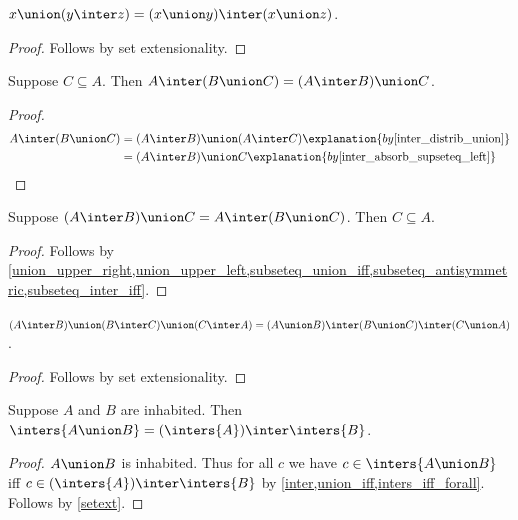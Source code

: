 \begin{proposition}%
\label{union_distrib_inter}
    $x\union (y\inter z) = (x\union y)\inter (x\union z)$.
\end{proposition}
\begin{proof}
    Follows by set extensionality.
\end{proof}

\begin{proposition}\label{union_inter_assoc_intro}
    Suppose $C\subseteq A$.
    Then $A\inter (B\union C) = (A\inter B)\union C$.
\end{proposition}
\begin{proof}
    \begin{align*}
        A\inter (B\union C) &= (A\inter B)\union (A\inter C) \explanation{by \cref{inter_distrib_union}}\\
        &= (A\inter B)\union C \explanation{by \cref{inter_absorb_supseteq_left}}
    \end{align*}
\end{proof}

\begin{proposition}\label{union_inter_assoc_elim}
    Suppose $(A\inter B)\union C = A\inter (B\union C)$.
    Then $C\subseteq A$.
\end{proposition}
\begin{proof}
    Follows by \cref{union_upper_right,union_upper_left,subseteq_union_iff,subseteq_antisymmetric,subseteq_inter_iff}.
\end{proof}

\begin{proposition}\label{union_inter_crazy}
    $(A\inter B)\union (B\inter C)\union (C\inter A)
    =
    (A\union B)\inter (B\union C)\inter (C\union A)$.
\end{proposition}
\begin{proof}
    Follows by set extensionality.
\end{proof}


\begin{proposition}\label{inters_distrib_union}
    Suppose $A$ and $B$ are inhabited.
    Then $\inters{A\union B} = (\inters{A})\inter\inters{B}$.
\end{proposition}
\begin{proof}
    $A\union B$ is inhabited.
    Thus for all $c$ we have $c\in\inters{A\union B}$ iff $c\in(\inters{A})\inter\inters{B}$
        by \cref{inter,union_iff,inters_iff_forall}.
    Follows by \cref{setext}. %
\end{proof}

